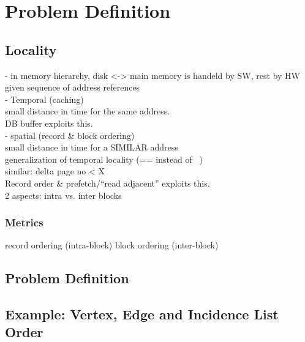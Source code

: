 \chapter{Problem Definition}\label{\positionnumber}
\section{Locality}\label{\positionnumber}
- in memory hierarchy, disk <-> main memory is handeld by SW, rest by HW \\

given sequence of address references \\
- Temporal (caching) \\
        small distance in time for the same address. \\
        DB buffer exploits this. \\
        
- spatial (record & block ordering) \\
    small distance in time for a SIMILAR address \\
    generalization of temporal locality (== instead of ~) \\
    similar: delta page no < X \\
    Record order & prefetch/``read adjacent'' exploits this. \\
    2 aspects: intra vs. inter blocks \\

    
    
    
    \subsection*{Metrics} 
    record ordering (intra-block)
    block ordering (inter-block)
        
\section{Problem Definition}\label{\positionnumber}

\section{Example: Vertex, Edge and Incidence List Order}


